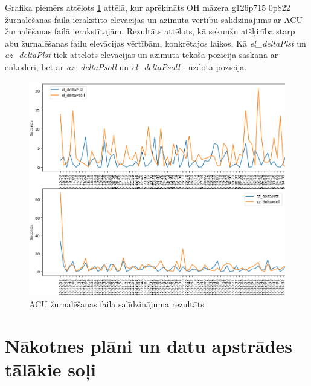 Grafika piemērs attēlots \ref{fig:acu-example-plot} attēlā, kur aprēķināts OH māzera g126p715 0p822 žurnalēšanas failā ierakstīto elevācijas un azimuta vērtību salīdzinājums ar ACU žurnalēšanas failā ierakstītajām. Rezultāts attēlots, kā sekunžu atšķirība starp abu žurnalēšanas failu  elevācijas vērtībām, konkrētajos laikos. Kā \textit{el\_deltaPlst} un \textit{az\_deltaPlst} tiek attēlots elevācijas un azimuta tekošā pozīcija saskaņā ar enkoderi, bet ar \textit{az\_deltaPsoll} un \textit{el\_deltaPsoll} - uzdotā pozīcija.


\begin{figure}[H]
\centering
\includegraphics[width=\textwidth]{images/created/ACU-example.png}
\caption{ACU žurnalēšanas faila salīdzinājuma rezultāts}
\label{fig:acu-example-plot}
\end{figure}

\section{Nākotnes plāni un datu apstrādes tālākie soļi}




